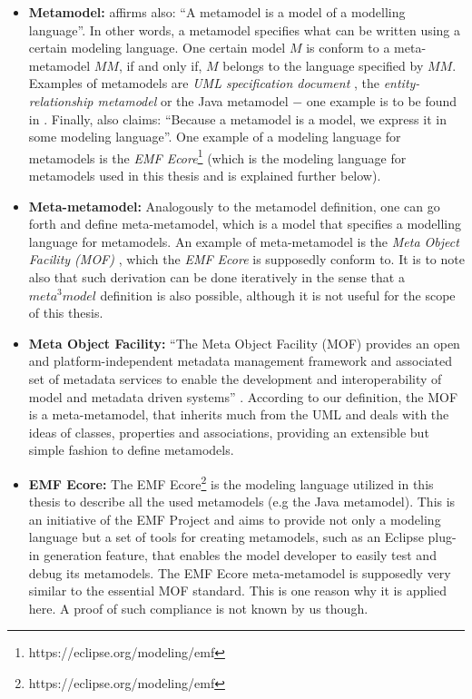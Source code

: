 \documentclass[tuberlin,cic,tc,english,noabntcite,oneside]{iiufrgs}
\begin{document}
\begin{itemize}
	\item \textbf{Metamodel:} \citet[p. 14]{favre2004foundations2} affirms also: \enquote{A metamodel is a model of a modelling language}. In other words, a metamodel specifies what can be written using a certain modeling language. One certain model $M$ is conform to a meta-metamodel $MM$, if and only if, $M$ belongs to the language specified by $MM$. Examples of metamodels are \emph{UML specification document} \citep{omg2007unified}, the \emph{entity-relationship metamodel} \citep{chen1976entity} or the Java metamodel $-$ one example is to be found in \citet{heidenreich2009jamopp}. Finally, \citet[p. 29]{seidewitz2003models} also claims: \enquote{Because a metamodel is a model, we express it in some modeling language}. One example of a modeling language for metamodels is the \emph{EMF Ecore}\footnote{https://eclipse.org/modeling/emf} (which is the modeling language for metamodels used in this thesis and is explained further below).

	\item \textbf{Meta-metamodel:} Analogously to the metamodel definition, one can go forth and define meta-metamodel, which is a model that specifies a modelling language for metamodels. An example of meta-metamodel is the \emph{Meta Object Facility (MOF)} \citep{omg2015meta}, which the \emph{EMF Ecore} is supposedly conform to. It is to note also that such derivation can be done iteratively in the sense that a $meta^3model$ definition is also possible, although it is not useful for the scope of this thesis.
	
	\item \textbf{Meta Object Facility:} \enquote{The Meta Object Facility (MOF) provides an open and platform-independent metadata management framework and associated set of metadata services to enable the development and interoperability of model and metadata driven systems} \citep{omg2015meta}. According to our definition, the MOF is a meta-metamodel, that inherits much from the UML and deals with the ideas of classes, properties and associations, providing an extensible but simple fashion to define metamodels.
	
	\item \textbf{EMF Ecore:} The EMF Ecore\footnote{https://eclipse.org/modeling/emf} is the modeling language utilized in this thesis to describe all the used metamodels (e.g the Java metamodel). This is an initiative of the EMF Project and aims to provide not only a modeling language but a set of tools for creating metamodels, such as an Eclipse plug-in generation feature, that enables the model developer to easily test and debug its metamodels. The EMF Ecore meta-metamodel is supposedly very similar to the essential MOF standard. This is one reason why it is applied here. A proof of such compliance is not known by us though.
\end{itemize}
	
\end{document}

